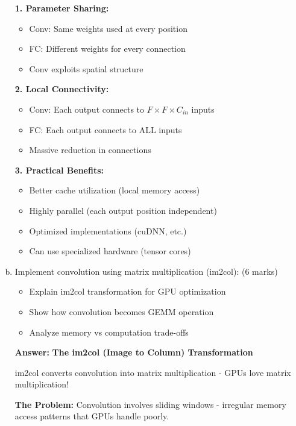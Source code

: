 \documentclass[12pt]{article}
\newcommand{\answer}[1]{{\color{answercolor}\textbf{Answer:} #1}}
\newcommand{\explanation}[1]{{\color{explanationcolor}#1}}
\begin{document}
\begin{enumerate}[(a)]
{    \explanation{
    \textbf{1. Parameter Sharing:}
    \begin{itemize}
        \item Conv: Same weights used at every position
        \item FC: Different weights for every connection
        \item Conv exploits spatial structure
    \end{itemize}
    
    \textbf{2. Local Connectivity:}
    \begin{itemize}
        \item Conv: Each output connects to $F \times F \times C_{in}$ inputs
        \item FC: Each output connects to ALL inputs
        \item Massive reduction in connections
    \end{itemize}
    
    \textbf{3. Practical Benefits:}
    \begin{itemize}
        \item Better cache utilization (local memory access)
        \item Highly parallel (each output position independent)
        \item Optimized implementations (cuDNN, etc.)
        \item Can use specialized hardware (tensor cores)
    \end{itemize}
    }
    }
    
    \item Implement convolution using matrix multiplication (im2col): \hfill (6 marks)
    \begin{itemize}
        \item Explain im2col transformation for GPU optimization
        \item Show how convolution becomes GEMM operation
        \item Analyze memory vs computation trade-offs
    \end{itemize}
    
    \answer{
    \textbf{The im2col (Image to Column) Transformation}
    
    \explanation{
    im2col converts convolution into matrix multiplication - GPUs love matrix multiplication!
    
    \textbf{The Problem:}
    Convolution involves sliding windows - irregular memory access patterns that GPUs handle poorly.
    
}}
\end{enumerate}
\end{document}

